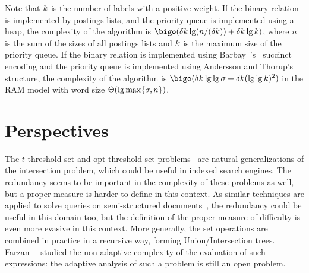   Note that $k$ is the number of labels with a positive weight.
  If the binary relation is implemented by postings lists, and the
  priority queue is implemented using a heap, the complexity of the
  algorithm is $\bigo ( \difficulty \nbkeywords \lg (n / (\difficulty
  \nbkeywords)) + \difficulty \nbkeywords \lg {\nbkeywords } )$, where
  $n$ is the sum of the sizes of all postings lists and $k$
  is the maximum size of the priority queue.
  If the binary relation is implemented using
  Barbay~\etal's~\cite{weightedQueriesOnBinaryRelationsAndMultiLabeledTrees}
  succinct encoding and the priority queue is implemented using
  Andersson and
  Thorup's~\cite{tighterWorstCaseBoundsOnDynamicSearchingAndPriorityQueues}
  structure, the complexity of the algorithm is
  $\bigo(\difficulty\nbkeywords\lg\lg\nblabels +
  \difficulty\nbkeywords(\lg\lg\nbkeywords)^2)$ in the RAM model with
  word size $\Theta(\lg\max\{\sigma,n\})$.













\section{Perspectives}
\label{sec:perspectives}


The $t$-threshold set and opt-threshold set
problems~\cite{deterministicAlgorithmForTheTThresholdSetProblem} are
natural generalizations of the intersection problem, which could be
useful in indexed search engines.
%
The redundancy seems to be important in the complexity of these
problems as well, but a proper measure is harder to define in this
context.
%
As similar techniques are applied to solve queries on semi-structured
documents~\cite{indexTreesForDescendantTreeQueriesInTheComparisonModel},
the redundancy could be useful in this domain too, but the definition
of the proper measure of difficulty is even more evasive in this
context.
%
More generally, the set operations are combined in practice in a
recursive way, forming Union/Intersection trees.
%
Farzan~\etal~\cite{worstCaseOptimalUnionIntersectionExpressionEvaluation}
studied the non-adaptive complexity of the evaluation of such
expressions: the adaptive analysis of such a problem is still an open
problem.


